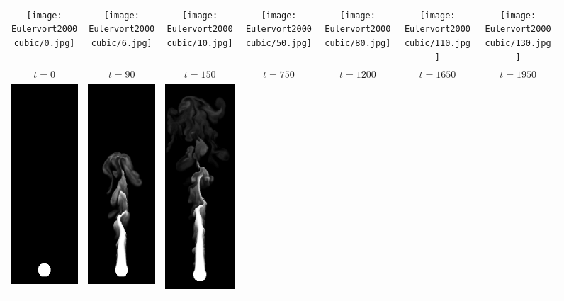 \documentclass[accepted,single]{gipaper}
\begin{document}
\begin{figure}
  \begin{center}
    \begin{tabular}{ccccccc}
      \texttt{[image: Eulervort2000cubic/0.jpg]} &  \texttt{[image: Eulervort2000cubic/6.jpg]}&  \texttt{[image: Eulervort2000cubic/10.jpg]}
      &  \texttt{[image: Eulervort2000cubic/50.jpg]} &  \texttt{[image: Eulervort2000cubic/80.jpg]} &  \texttt{[image: Eulervort2000cubic/110.jpg]}
      &  \texttt{[image: Eulervort2000cubic/130.jpg]} \\
      $t = 0$ & $t = 90$ & $t = 150$ & $t = 750$ & $t = 1200$  & $t = 1650$ & $t = 1950$ \\[0.5cm] 
      \includegraphics[width=0.12\linewidth]{RKI2000linearvort/0.png} & \includegraphics[width=0.12\linewidth]{RKI2000linearvort/6.png} & \includegraphics[width=0.12\linewidth]{RKI2000linearvort/10.png} & 

\end{tabular}
\end{center}
\end{figure}
\end{document}
